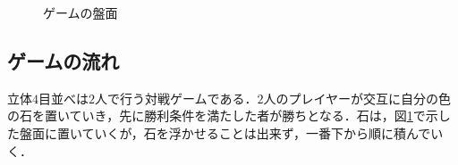 \documentclass{jarticle}
\begin{document}
\begin{figure}[H]
\centering
	\caption{ゲームの盤面}
	\label{fig:game_board}
\end{figure}




\subsection{ゲームの流れ}
立体$4$目並べは$2$人で行う対戦ゲームである．$2$人のプレイヤーが交互に自分の色の石を置いていき，先に勝利条件を満たした者が勝ちとなる．石は，図\ref{fig:game_board}で示した盤面に置いていくが，石を浮かせることは出来ず，一番下から順に積んでいく．
\end{document}
